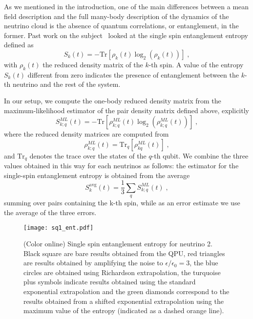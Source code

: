 \documentclass[Dual]{msu-thesis}
\begin{document}
As we mentioned in the introduction, one of the main differences between a mean field description and the full many-body description of the dynamics of the neutrino cloud is the absence of quantum correlations, or entanglement, in the former. Past work on the subject~\cite{Cervia:2019,Rrapaj2020} looked at the single spin entanglement entropy defined as
\begin{equation}
 S_k(t) = - \text{Tr} \left[{\rho}_k(t)\log_2\left({\rho}_k(t)\right)\right]\;,
\end{equation}
with ${\rho}_k(t)$ the reduced density matrix of the $k$-th spin. A value of the entropy $S_k(t)$ different from zero indicates the presence of entanglement between the $k$-th neutrino and the rest of the system.

In our setup, we compute the one-body reduced density matrix from the maximum-likelihood estimator of the pair density matrix defined above, explicitly
\begin{equation}
S^{ML}_{k;q}(t) = - \text{Tr} \left[{\rho}^{ML}_{k;q}(t)\log_2\left({\rho}^{ML}_{k;q}(t)\right)\right]\;,
\end{equation}
where the reduced density matrices are computed from
\begin{equation}
{\rho}^{ML}_{k;q}(t) = \text{Tr}_q \left[{\rho}^{ML}_{kq}(t)\right]\;,
\end{equation}
and $\text{Tr}_q$ denotes the trace over the states of the $q$-th qubit.
We combine the three values obtained in this way for each neutrinos as follows: the estimator for the single-spin entanglement entropy is obtained from the average 
\begin{equation}
S^{\text{avg}}_k(t) = \frac{1}{3} \sum_{q}S^{ML}_{k;q}(t)\;,
\end{equation}
summing over pairs containing the k-th spin, while as an error estimate we use the average of the three errors.

\begin{figure}
 \centering
 \texttt{[image: sq1\_ent.pdf]}
 \caption{(Color online) Single spin entanglement entropy for neutrino 2. Black square are bare results obtained from the QPU, red triangles are results obtained by amplifying the noise to $\epsilon/\epsilon_0=3$, the blue circles are obtained using Richardson extrapolation, the turquoise plus symbols indicate results obtained using the standard exponential extrapolation and the green diamonds correspond to the results obtained from a shifted exponential extrapolation using the maximum value of the entropy (indicated as a dashed orange line).}
\label{fig:sq_ent1}
\end{figure}
\end{document}

